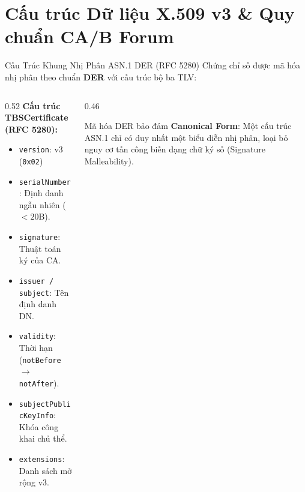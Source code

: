 \section{Cấu trúc Dữ liệu X.509 v3 \& Quy chuẩn CA/B Forum}

\begin{frame}{Cấu Trúc Khung Nhị Phân ASN.1 DER (RFC 5280)}
  \small
  Chứng chỉ số được mã hóa nhị phân theo chuẩn \textbf{DER} với cấu trúc bộ ba TLV:
  \begin{columns}[T]
    \begin{column}{0.52\textwidth}
      \textbf{Cấu trúc TBSCertificate (RFC 5280):}
      \begin{itemize}\scriptsize
        \item \texttt{version}: v3 (\texttt{0x02})
        \item \texttt{serialNumber}: Định danh ngẫu nhiên ($< 20$B).
        \item \texttt{signature}: Thuật toán ký của CA.
        \item \texttt{issuer / subject}: Tên định danh DN.
        \item \texttt{validity}: Thời hạn (\texttt{notBefore} $\to$ \texttt{notAfter}).
        \item \texttt{subjectPublicKeyInfo}: Khóa công khai chủ thể.
        \item \texttt{extensions}: Danh sách mở rộng v3.
      \end{itemize}
    \end{column}
    \begin{column}{0.46\textwidth}
      \begin{keybox}
        Mã hóa DER bảo đảm \textbf{Canonical Form}: Một cấu trúc ASN.1 chỉ có duy nhất một biểu diễn nhị phân, loại bỏ nguy cơ tấn công biến dạng chữ ký số (Signature Malleability).
      \end{keybox}
    \end{column}
  \end{columns}
\end{frame}

